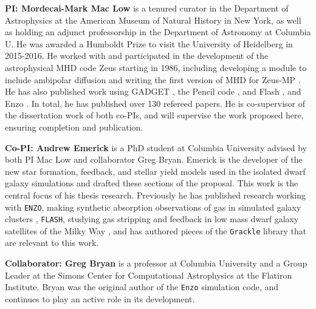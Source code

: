 \documentclass[11pt]{article}
\begin{document}
\textbf{PI: Mordecai-Mark Mac Low}  is a tenured curator in the Department of Astrophysics at the American
Museum of Natural History in New York, as well as holding an adjunct professorship in the Department of 
Astronomy at Columbia U.  He was awarded a Humboldt Prize to visit the University of Heidelberg in 2015-2016.
He worked with and participated in the
development of the astrophysical MHD code Zeus starting in 1986, including
developing a module to include ambipolar diffusion
\citep{MacLow1995,MacLowSmith1997} and writing the first version of MHD
for Zeus-MP 
\citep{Hayes2006}.  He has also published work using GADGET 
\citep{Li2005,Li2005a,Li2006},
the Pencil code 
\citep{Oishi2007,Johansen2007,Johansen2009,Yang2009,OishiMacLow2009,McNally2014}, and
Flash 
\citep{Joung2006,Joung2009,Peters2010,Peters2010a,Peters2010b,Peters2011,Peters2012,Hill2012,Gatto2015,Girichidis2016SImulatingOutflows,Ibanez-Mejia2016}, and Enzo \citep{Simpson2013}.
In
total, he has published over 130 refereed papers. He is co-supervisor of the dissertation work of both co-PIs, and
will supervise the work proposed here, ensuring completion and publication.

\textbf{Co-PI: Andrew Emerick} is a PhD student at Columbia University advised by both PI Mac Low and collaborator Greg Bryan. Emerick is the developer of the new star formation, feedback, and stellar yield models used in the isolated dwarf galaxy simulations and drafted these sections of the proposal. This work is the central focus of his thesis research. Previously he has published research working with \texttt{ENZO}, making synthetic absorption observations of gas in simulated galaxy clusters \citep{Emerick2015}, \texttt{FLASH}, studying gas stripping and feedback in low mass dwarf galaxy satellites of the Milky Way \citep{Emerick2016}, and has authored pieces of the \texttt{Grackle} library \citep{Grackle} that are relevant to this work.

\textbf{Collaborator: Greg Bryan} is a professor at Columbia University and a Group Leader at the Simons Center for Computational Astrophysics at the Flatiron Institute. Bryan was the original author of the \texttt{Enzo} simulation code, and continues to play an active role in its development. %
\end{document}
